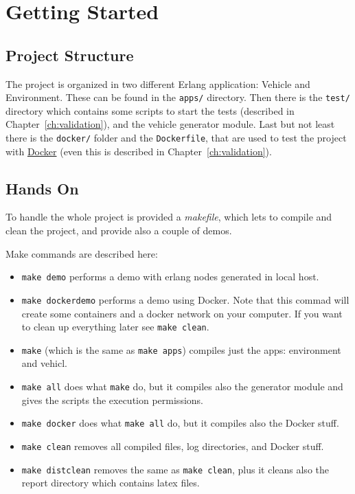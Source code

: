 \documentclass{memoir}
\begin{document}
\section{Getting Started}
\subsection{Project Structure}
The project is organized in two different Erlang application: Vehicle and Environment. These can be found in the \verb|apps/| directory. Then there is the \verb|test/| directory which contains some scripts to start the tests (described in Chapter~\ref{ch:validation}), and the vehicle generator module. Last but not least there is the \verb|docker/| folder and the \verb|Dockerfile|, that are used to test the project with \href{https://www.docker.com/}{Docker} (even this is described in Chapter~\ref{ch:validation}).

\subsection{Hands On}
To handle the whole project is provided a \emph{makefile}, which lets to compile and clean the project, and provide also a couple of demos.

Make commands are described here:
\begin{itemize}
	\item \verb|make demo| performs a demo with erlang nodes generated in local host.
	\item \verb|make dockerdemo| performs a demo using Docker. Note that this commad will create some containers and a docker network on your computer. If you want to clean up everything later see \verb|make clean|.
	\item \verb|make| (which is the same as \verb|make apps|) compiles just the apps: environment and vehicl.
	\item \verb|make all| does what \verb|make| do, but it compiles also the generator module and gives the scripts the execution permissions.
	\item \verb|make docker| does what \verb|make all| do, but it compiles also the Docker stuff.
	\item  \verb|make clean| removes all compiled files, log directories, and Docker stuff.
	\item  \verb|make distclean| removes the same as \verb|make clean|, plus it cleans also the report directory which contains latex files.
\end{itemize}
\end{document}
